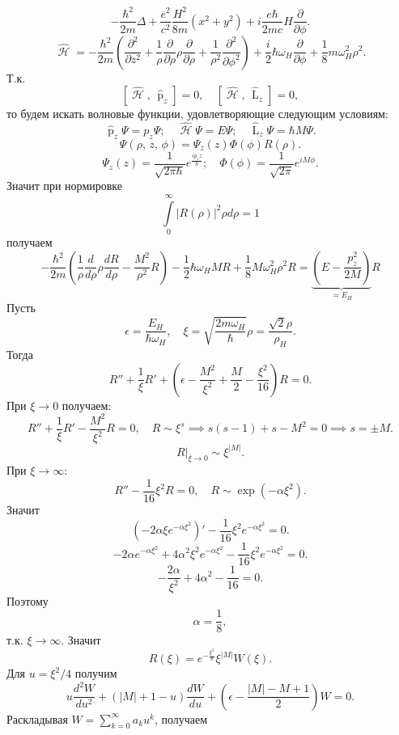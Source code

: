 \documentclass[a4paper]{article}
\begin{document}
\begin{sol}
\begin{enumerate}
\[	- \frac{\hbar ^2}{2m}\Delta
	+\frac{e^2}{c^2}
	\frac{H^2}{8m} \left( x^2+y^2 \right) 
	+ i \frac{e\hbar }{2mc}
	H \frac{\partial }{\partial \phi} 
.\] 
\[
	\widehat{\operatorname{\mathcal{H}}}
	= - \frac{\hbar ^2}{2m}
	\left( \frac{\partial ^2}{\partial z^2} +
	\frac{1}{\rho} \frac{\partial }{\partial \rho} \rho \frac{\partial }{\partial \rho} +
\frac{1}{\rho^2} \frac{\partial ^2}{\partial \phi^2} \right) +
\frac{i}{2} \hbar  \omega_H \frac{\partial }{\partial \phi} +
\frac{1}{8} m\omega_H^2 \rho^2
.\] 
Т.\:к.
\[
	\left[ \widehat{\operatorname{\mathcal{H}}},\,
	\widehat{\operatorname{p}}_z\right] =0,
	\quad \left[ 
	\widehat{\operatorname{\mathcal{H}}},\,
\widehat{\operatorname{L}}_z\right] =0
,\] 
то будем искать волновые функции, удовлетворяющие
следующим условиям:
\[
\widehat{\operatorname{p}}_z \Psi =p_z
\Psi;\quad
\widehat{\operatorname{\mathcal{H}}}\Psi
=E\Psi;\quad
\widehat{\operatorname{L}}_z\Psi=
\hbar  M\Psi
.\] 
\[
	\Psi(\rho,\,z,\,\phi)=
	\Psi_z (z) \Phi(\phi) R(\rho)
.\] 
\[
	\Psi_z (z)= \frac{1}{\sqrt{2 \pi \hbar } }
	e^{\frac{i p_z z}{\hbar }};\quad
	\Phi(\phi)= \frac{1}{\sqrt{2\pi} }
	e^{iM\phi}
.\] 
Значит при нормировке
\[
	\int\limits_{0}^{\infty} |R(\rho)|^2
	\rho d\rho=1
\] 
получаем
\[
	- \frac{\hbar ^2}{ 2m}\left( 
	\frac{1}{\rho} \frac{d}{d\rho}
\rho \frac{dR}{d\rho}
-\frac{M^2}{\rho^2} R\right) -
\frac{1}{2} \hbar  \omega_H M R+
\frac{1}{8} M \omega_H^2 \rho^2 R=
\underbrace{\left( E- \frac{p_z^2}{2M} \right) }_{
=E_H}R
\]
Пусть
\[
\epsilon= \frac{E_H}{\hbar  \omega_H},\quad
\xi= \sqrt{ \frac{2m \omega_H}{\hbar }}\rho= \frac{\sqrt{2} \rho}{\rho_H}
.\] 
Тогда
\[
R''+\frac{1}{\xi} R' +
\left( \epsilon - \frac{M^2}{\xi^2}+\frac{M}{2}
-\frac{\xi^2}{16}\right) R=0
.\] 
При $\xi\to 0$ получаем:
\[
R''+ \frac{1}{\xi}R'- \frac{M^2}{\xi^2}R=0,\quad
R \sim  \xi^s \implies
s(s-1)+s -M^2=0 \implies s=\pm M
.\] 
\[
R|_{\xi\to 0} \sim  \xi^{|M|}
.\] 
При $\xi \to \infty$:
\[
R''- \frac{1}{16}\xi^2 R=0,\quad
R \sim  \exp \left( -\alpha \xi^2 \right) 
.\] 
Значит
\[
	\left( -2\alpha \xi e^{-\alpha \xi^2} \right) '- \frac{1}{16} \xi^2 e^{-\alpha \xi^2}=0
.\] 
\[
-2\alpha e^{-\alpha \xi^2}+
4 \alpha^2 \xi^2 e^{-\alpha \xi^2}-\frac{1}{16}
\xi^2 e^{-\alpha \xi^2}=0
.\] 
\[
-\frac{2\alpha}{\xi^2}+4\alpha^2-\frac{1}{16}=0
.\] 
Поэтому
\[
\alpha=\frac{1}{8}
,\]
т.\:к. $\xi\to \infty$. Значит
\[
	R(\xi)= e^{-\frac{\xi^2}{8}}\xi^{|M|}
	W(\xi)
.\] 
Для $u= \xi^2 /4$ получим
\[
u \frac{d^2 W}{du^2}+
\left( |M|+1-u \right) \frac{dW}{du}
+\left( \epsilon - \frac{|M|-M+1}{2} \right) 
W=0
.\] 
Раскладывая $\displaystyle W= \sum_{k=0}^{\infty} a_k u^k$, получаем

\end{enumerate}
\end{sol}
\end{document}
